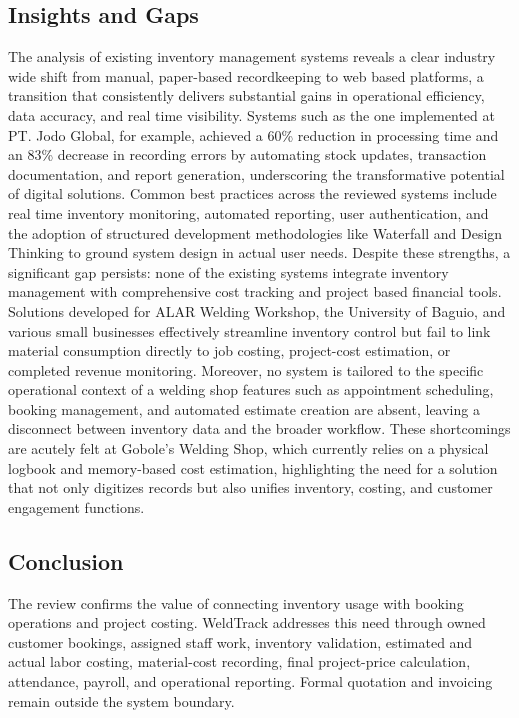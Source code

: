 \documentclass[12pt, letterpaper]{article}
\begin{document}
\subsection{Insights and Gaps}

 \hspace*{2em}The analysis of existing inventory management systems reveals a clear industry wide shift from manual, paper-based recordkeeping to web based platforms, a transition that consistently delivers substantial gains in operational efficiency, data accuracy, and real time visibility. Systems such as the one implemented at PT. Jodo Global, for example, achieved a 60\% reduction in processing time and an 83\% decrease in recording errors by automating stock updates, transaction documentation, and report generation, underscoring the transformative potential of digital solutions. Common best practices across the reviewed systems include real time inventory monitoring, automated reporting, user authentication, and the adoption of structured development methodologies like Waterfall and Design Thinking to ground system design in actual user needs. Despite these strengths, a significant gap persists: none of the existing systems integrate inventory management with comprehensive cost tracking and project based financial tools. Solutions developed for ALAR Welding Workshop, the University of Baguio, and various small businesses effectively streamline inventory control but fail to link material consumption directly to job costing, project-cost estimation, or completed revenue monitoring. Moreover, no system is tailored to the specific operational context of a welding shop features such as appointment scheduling, booking management, and automated estimate creation are absent, leaving a disconnect between inventory data and the broader workflow. These shortcomings are acutely felt at Gobole’s Welding Shop, which currently relies on a physical logbook and memory-based cost estimation, highlighting the need for a solution that not only digitizes records but also unifies inventory, costing, and customer engagement functions.
\subsection{Conclusion}
 \hspace*{2em} The review confirms the value of connecting inventory usage with booking operations and project costing. WeldTrack addresses this need through owned customer bookings, assigned staff work, inventory validation, estimated and actual labor costing, material-cost recording, final project-price calculation, attendance, payroll, and operational reporting. Formal quotation and invoicing remain outside the system boundary.
\end{document}
